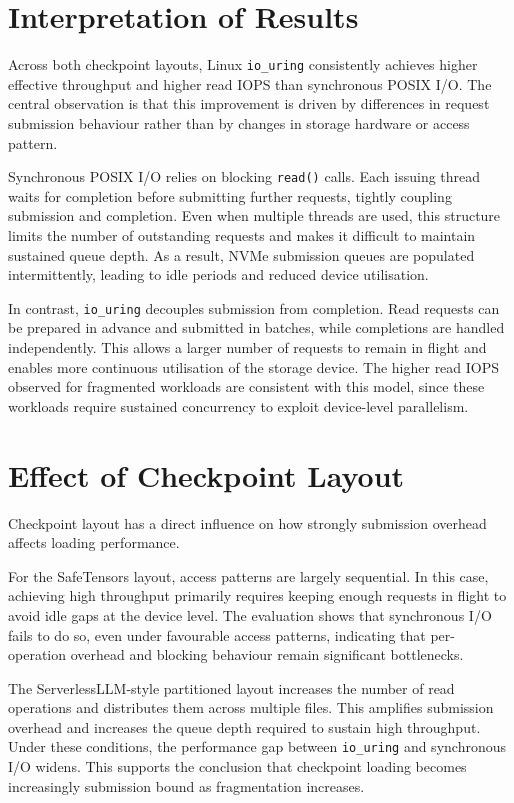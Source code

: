 \documentclass[]{final_report}
\begin{document}
\section{Interpretation of Results}

Across both checkpoint layouts, Linux \texttt{io\_uring} consistently achieves higher effective throughput and higher read IOPS than synchronous POSIX I/O. The central observation is that this improvement is driven by differences in request submission behaviour rather than by changes in storage hardware or access pattern.

Synchronous POSIX I/O relies on blocking \texttt{read()} calls. Each issuing thread waits for completion before submitting further requests, tightly coupling submission and completion. Even when multiple threads are used, this structure limits the number of outstanding requests and makes it difficult to maintain sustained queue depth. As a result, NVMe submission queues are populated intermittently, leading to idle periods and reduced device utilisation.

In contrast, \texttt{io\_uring} decouples submission from completion. Read requests can be prepared in advance and submitted in batches, while completions are handled independently. This allows a larger number of requests to remain in flight and enables more continuous utilisation of the storage device. The higher read IOPS observed for fragmented workloads are consistent with this model, since these workloads require sustained concurrency to exploit device-level parallelism.

\section{Effect of Checkpoint Layout}

Checkpoint layout has a direct influence on how strongly submission overhead affects loading performance.

For the SafeTensors layout, access patterns are largely sequential. In this case, achieving high throughput primarily requires keeping enough requests in flight to avoid idle gaps at the device level. The evaluation shows that synchronous I/O fails to do so, even under favourable access patterns, indicating that per-operation overhead and blocking behaviour remain significant bottlenecks.

The ServerlessLLM-style partitioned layout increases the number of read operations and distributes them across multiple files. This amplifies submission overhead and increases the queue depth required to sustain high throughput. Under these conditions, the performance gap between \texttt{io\_uring} and synchronous I/O widens. This supports the conclusion that checkpoint loading becomes increasingly submission bound as fragmentation increases.
\end{document}
